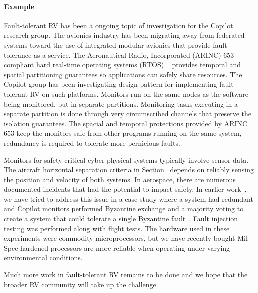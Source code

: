  \paragraph{Example} Fault-tolerant RV has been a ongoing topic of
 investigation for the Copilot research group. The avionics industry
 has been migrating away from federated systems toward the use of
 integrated modular avionics that provide fault-tolerance as a
 service.  The Aeronautical Radio, Incorporated (ARINC)
 653~\cite{ARINC653} compliant hard real-time operating systems (RTOS)
 ~\cite{Kaveh15} provides temporal and spatial partitioning guarantees
 so applications can safely share resources.  The Copilot group has
 been investigating design pattern for implementing fault-tolerant RV
 on such platforms. Monitors run on the same nodes as the software
 being monitored, but in separate partitions. Monitoring tasks
 executing in a separate partition is done through very circumscribed
 channels that preserve the isolation guarantees.  The spacial and
 temporal protections provided by ARINC 653 keep the monitors safe
 from other programs running on the same system, redundancy is
 required to tolerate more pernicious faults.


 Monitors for safety-critical cyber-physical systems typically involve
 sensor data. The aircraft horizontal separation criteria in
 Section~\cite{sec:spec} depends on reliably sensing the position and
 velocity of both systems.  In aerospace, there are numerous
 documented incidents that had the potential to impact safety.  In
 earlier work~\cite{pike-isse-13}, we have tried to address this issue
 in a case study where a system had redundant and Copilot monitors
 performed Byzantine exchange and a majority voting to create a system
 that could tolerate a single Byzantine fault~\cite{pike-isse-13}.
 Fault injection testing was performed along with flight tests.  The
 hardware used in these experiments were commodity microprocessors,
 but we have recently bought Mil-Spec hardened processors are more
 reliable when operating under varying environmental conditions.

Much more work in fault-tolerant RV remains to be done and we hope
that the broader RV community will take up the challenge.





